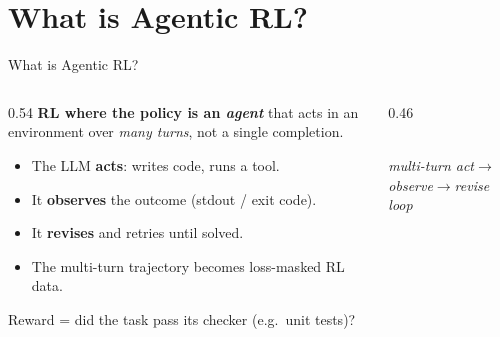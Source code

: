 \documentclass[aspectratio=169]{beamer}
\begin{document}
\section{What is Agentic RL?}


\begin{frame}{What is Agentic RL?}
  \begin{columns}[T]
    \begin{column}{0.54\textwidth}
      \textbf{RL where the policy is an \emph{agent}} that acts in an environment over
      \emph{many turns}, not a single completion.
      \vspace{0.3em}
      \begin{itemize}\setlength\itemsep{0.25em}
        \item The LLM \textbf{acts}: writes code, runs a tool.
        \item It \textbf{observes} the outcome (stdout / exit code).
        \item It \textbf{revises} and retries until solved.
        \item The multi-turn trajectory becomes loss-masked RL data.
      \end{itemize}
      \vspace{0.3em}
      \footnotesize Reward = did the task pass its checker (e.g.\ unit tests)?
    \end{column}
    \begin{column}{0.46\textwidth}
      \centering
      \\[0.2em]{\scriptsize\itshape multi-turn act$\to$observe$\to$revise loop}
    \end{column}
  \end{columns}
\end{frame}
\end{document}
